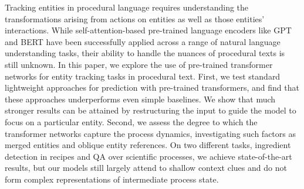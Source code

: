 Tracking entities in procedural language requires understanding the transformations arising from actions on entities as well as those entities' interactions. While self-attention-based pre-trained language encoders like GPT and BERT  have been successfully applied across a range of natural language understanding tasks, their ability to handle the nuances of procedural texts is still unknown.  In this paper, we explore the use of pre-trained transformer networks for entity tracking tasks in procedural text. First, we test standard lightweight approaches for prediction with pre-trained transformers, and find that these approaches underperforms even simple baselines. We show that much stronger results can be attained by restructuring the input to guide the model to focus on a particular entity. Second, we assess the degree to which the transformer networks capture the process dynamics, investigating such factors as merged entities and oblique entity references. On two different tasks, ingredient detection in recipes and QA over scientific processes, we achieve state-of-the-art results, but our models still largely attend to shallow context clues and do not form complex representations of intermediate process state.